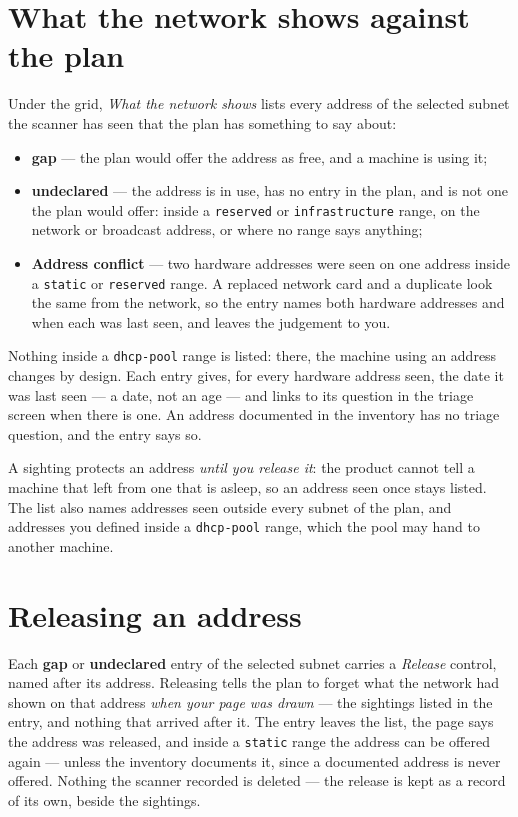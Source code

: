 \documentclass[11pt,oneside,listof=totoc,bibliography=totoc]{scrreprt}
\begin{document}
\section{What the network shows against the plan}
Under the grid, \emph{What the network shows} lists every address of the selected subnet the
scanner has seen that the plan has something to say about:
\begin{itemize}
  \item \textbf{gap} --- the plan would offer the address as free, and a machine is using it;
  \item \textbf{undeclared} --- the address is in use, has no entry in the plan, and is not one
        the plan would offer: inside a \texttt{reserved} or \texttt{infrastructure} range, on the
        network or broadcast address, or where no range says anything;
  \item \textbf{Address conflict} --- two hardware addresses were seen on one address inside a
        \texttt{static} or \texttt{reserved} range. A replaced network card and a duplicate look the
        same from the network, so the entry names both hardware addresses and when each was last
        seen, and leaves the judgement to you.
\end{itemize}
Nothing inside a \texttt{dhcp-pool} range is listed: there, the machine using an address changes by
design. Each entry gives, for every hardware address seen, the date it was last seen --- a date, not
an age --- and links to its question in the triage screen when there is one. An address documented
in the inventory has no triage question, and the entry says so.

A sighting protects an address \emph{until you release it}: the product cannot tell a machine that
left from one that is asleep, so an address seen once stays listed. The list also names addresses
seen outside every subnet of the plan, and addresses you defined inside a \texttt{dhcp-pool} range,
which the pool may hand to another machine.

\section{Releasing an address}
Each \textbf{gap} or \textbf{undeclared} entry of the selected subnet carries a \emph{Release}
control, named after its address. Releasing tells the plan to forget what the network had shown on
that address \emph{when your page was drawn} --- the sightings listed in the entry, and nothing that
arrived after it. The entry leaves the list, the page says the address was released, and inside a
\texttt{static} range the address can be offered again --- unless the inventory documents it, since
a documented address is never offered. Nothing the scanner recorded is deleted --- the release is
kept as a record of its own, beside the sightings.
\end{document}
